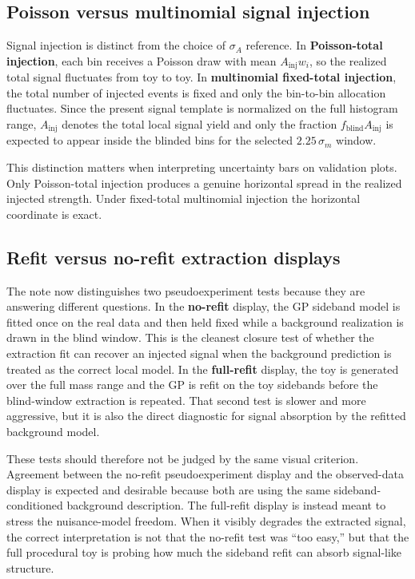 \subsection{Poisson versus multinomial signal injection}

Signal injection is distinct from the choice of $\sigma_A$ reference. In
\textbf{Poisson-total injection}, each bin receives a Poisson draw with mean
$A_{\mathrm{inj}}w_i$, so the realized total signal fluctuates from toy to toy. In
\textbf{multinomial fixed-total injection}, the total number of injected events is
fixed and only the bin-to-bin allocation fluctuates. Since the present signal template
is normalized on the full histogram range, $A_{\mathrm{inj}}$ denotes the total local
signal yield and only the fraction $f_{\mathrm{blind}}A_{\mathrm{inj}}$ is expected to
appear inside the blinded bins for the selected $2.25\,\sigma_m$ window.

This distinction matters when interpreting uncertainty bars on validation plots. Only
Poisson-total injection produces a genuine horizontal spread in the realized injected
strength. Under fixed-total multinomial injection the horizontal coordinate is exact.

\subsection{Refit versus no-refit extraction displays}

The note now distinguishes two pseudoexperiment tests because they are answering
different questions. In the \textbf{no-refit} display, the GP sideband model
is fitted once on the real data and then held fixed while a background realization is
drawn in the blind window. This is the cleanest closure test of whether the extraction
fit can recover an injected signal when the background prediction is treated as the
correct local model. In the \textbf{full-refit} display, the toy is generated over the
full mass range and the GP is refit on the toy sidebands before the blind-window
extraction is repeated. That second test is slower and more aggressive, but it is also
the direct diagnostic for signal absorption by the refitted background model.

These tests should therefore not be judged by the same visual criterion. Agreement
between the no-refit pseudoexperiment display and the observed-data display is expected
and desirable because both are using the same sideband-conditioned background
description. The full-refit display is instead meant to stress the nuisance-model
freedom. When it visibly degrades the extracted signal, the correct interpretation is
not that the no-refit test was ``too easy,'' but that the full procedural toy is
probing how much the sideband refit can absorb signal-like structure.

